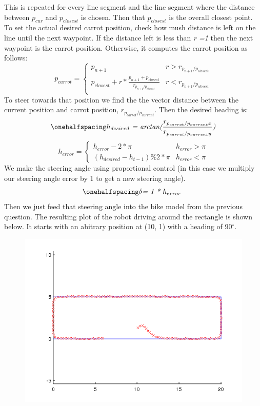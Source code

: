 \documentclass[12pt]{article}
\begin{document}
This is repeated for every line segment and the line segment where the distance between $p_{cur}$ and $p_{closest}$ is chosen. Then that $p_{closest}$ is the overall closest point. To set the actual desired carrot position, check how mush distance is left on the line until the next waypoint. If the distance left is less than \textit{r =1} then the next waypoint is the carrot position. Otherwise, it computes the carrot position as follows:
\[ 
      p_{carrot} = 
      \begin{cases} 
      p_{n+1} & r > r_{p_{n+1}/p_{closest}}\\
      p_{closest} + r * \frac{p_{n+1} + p_{closest}}{r_{p_{n+1}/p_{closest}}} & r < r_{p_{n+1}/p_{closest}} \\
   \end{cases}
\]
To steer towards that position we find the the vector distance between the current position and carrot position, \textit{$r_{p_{carrot}/p_{current}}$}. Then the desired heading is:
 \begin{equation}
\onehalfspacing
\centering
\emph{$h_{desired}$ = arctan($\frac{r_{p_{carrot}/p_{current}x}}{r_{p_{carrot}/p_{current}y}}$)}
\end{equation}
\[ 
      h_{error} = 
      \begin{cases} 
      h_{error} - 2*\pi & h_{error} > \pi \\
      (h_{desired} - h_{t-1}) \% 2*\pi & h_{error} < \pi
   \end{cases}
\]
We make the steering angle using proportional control (in this case we multiply our steering angle error by 1 to get a new steering angle).
\begin{equation}
\onehalfspacing
\centering
\emph{$\delta$= 1 * $h_{error}$ }
\end{equation}
Then we just feed that steering angle into the bike model from the previous question.
The resulting plot of the robot driving around the rectangle is shown below. It starts with an abitrary position at (10, 1) with a heading of 90$^\circ$.
\begin{figure}[ht]
\hspace{0.5cm}
\centering
\includegraphics[scale=0.5]{Pictures/carrot.png}
\end{figure}
\end{document}

